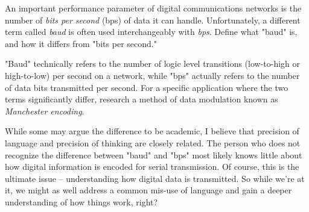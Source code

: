 

An important performance parameter of digital communications networks is the number of {\it bits per second} (bps) of data it can handle.  Unfortunately, a different term called {\it baud} is often used interchangeably with {\it bps}.  Define what "baud" is, and how it differs from "bits per second."







"Baud" technically refers to the number of logic level transitions (low-to-high or high-to-low) per second on a network, while "bps" actually refers to the number of data bits transmitted per second.  For a specific application where the two terms significantly differ, research a method of data modulation known as {\it Manchester encoding}.







While some may argue the difference to be academic, I believe that precision of language and precision of thinking are closely related.  The person who does not recognize the difference between "baud" and "bps" most likely knows little about how digital information is encoded for serial transmission.  Of course, this is the ultimate issue -- understanding how digital data is transmitted.  So while we're at it, we might as well address a common mis-use of language and gain a deeper understanding of how things work, right?




